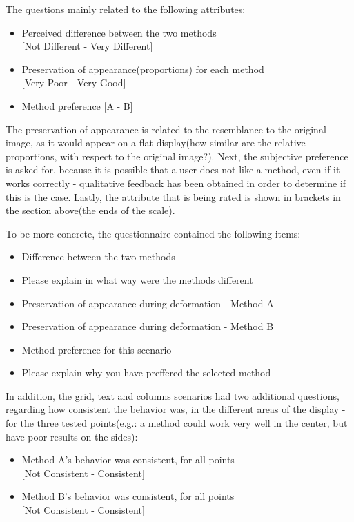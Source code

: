 \documentclass[]{article}
\begin{document}
The questions mainly related to the following attributes:
\begin{itemize}
\item Perceived difference between the two methods \\{[Not Different - Very Different]}
\item Preservation of appearance(proportions) for each method \\{[Very Poor - Very Good]}
\item Method preference [A - B]
\end{itemize}

The preservation of appearance is related to the resemblance to the original image, as it would appear on a flat display(how similar are the relative proportions, with respect to the original image?). Next, the subjective preference is asked for, because it is possible that a user does not like a method, even if it works correctly - qualitative feedback has been obtained in order to determine if this is the case. Lastly, the attribute that is being rated is shown in brackets in the section above(the ends of the scale).

To be more concrete, the questionnaire contained the following items:
\begin{itemize}
\item Difference between the two methods
\item Please explain in what way were the methods different
\item Preservation of appearance during deformation - Method A
\item Preservation of appearance during deformation - Method B
\item Method preference for this scenario
\item Please explain why you have preffered the selected method
\end{itemize}

In addition, the grid, text and columns scenarios had two additional questions, regarding how consistent the behavior was, in the different areas of the display - for the three tested points(e.g.: a method could work very well in the center, but have poor results on the sides):
\begin{itemize}
\item Method A's behavior was consistent, for all points \\{[Not Consistent - Consistent]}
\item Method B's behavior was consistent, for all points \\{[Not Consistent - Consistent]}
\end{itemize}
\end{document}
